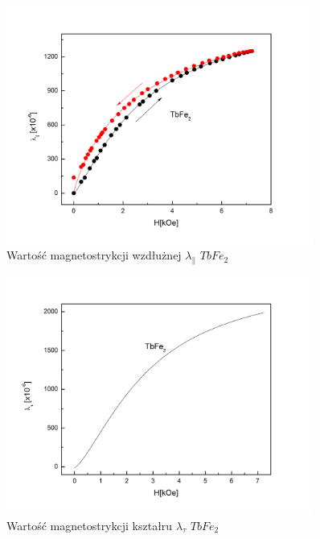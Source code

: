 \documentclass[a4paper,12pt]{article}
\numberwithin{equation}{section}
\begin{document}
\begin{figure}[h]
    \centering
    \includegraphics[width =0.9\textwidth]{../img/magneto/Tbwzdluzna}
    \caption{Wartość magnetostrykcji wzdłużnej $\lambda_{\parallel}$ $TbFe_2$}
    \label{Tbwzdluzna}
\end{figure}

\begin{figure}[h]
    \centering
    \includegraphics[width =0.9\textwidth]{../img/magneto/TbKsztaltu}
    \caption{Wartość magnetostrykcji kształru $\lambda_{\tau}$ $TbFe_2$}
    \label{TbKsztaltu}
\end{figure}
\end{document}
